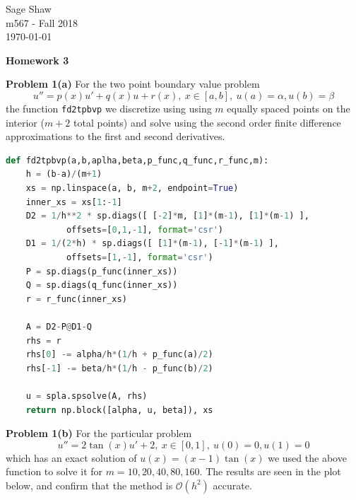 \documentclass[12pt]{article}
\newcommand{\problem}[1]{\hspace{-4 ex} \large \textbf{Problem #1} }
\begin{document}
	\thispagestyle{empty}
	
	\begin{flushright}
		Sage Shaw \\
		m567 - Fall 2018 \\
		\today
	\end{flushright}
	
\begin{center}{\large \textbf{Homework 3}}\end{center}
\bigbreak

\hspace{-.5 ex}\problem{1(a)} For the two point boundary value problem
$$
u'' = p(x)u' + q(x)u + r(x), \ x \in [a,b], \ u(a)=\alpha, u(b)=\beta
$$
the function \texttt{fd2tpbvp} we discretize using using $m$ equally spaced points on the interior ($m+2$ total points) and solve using the second order finite difference approximations to the first and second derivatives.
\bigbreak

\begin{lstlisting}[language=python]
def fd2tpbvp(a,b,aplha,beta,p_func,q_func,r_func,m):
	h = (b-a)/(m+1)
	xs = np.linspace(a, b, m+2, endpoint=True)
	inner_xs = xs[1:-1]
	D2 = 1/h**2 * sp.diags([ [-2]*m, [1]*(m-1), [1]*(m-1) ],
			offsets=[0,1,-1], format='csr')
	D1 = 1/(2*h) * sp.diags([ [1]*(m-1), [-1]*(m-1) ], 
			offsets=[1,-1], format='csr')
	P = sp.diags(p_func(inner_xs))
	Q = sp.diags(q_func(inner_xs))
	r = r_func(inner_xs)
	
	A = D2-P@D1-Q
	rhs = r
	rhs[0] -= alpha/h*(1/h + p_func(a)/2)
	rhs[-1] -= beta/h*(1/h - p_func(b)/2)
	
	u = spla.spsolve(A, rhs)
	return np.block([alpha, u, beta]), xs
\end{lstlisting}
\bigbreak

\problem{1(b)} For the particular problem
$$
u'' = 2\tan(x)u' + 2, \ x \in [0,1], \ u(0)=0, u(1)=0
$$
which has an exact solution of $u(x) = (x-1)\tan(x)$ we used the above function to solve it for $m= 10, 20, 40, 80, 160$. The results are seen in the plot below, and confirm that the method is $\mathcal{O}(h^2)$ accurate.
\end{document}
